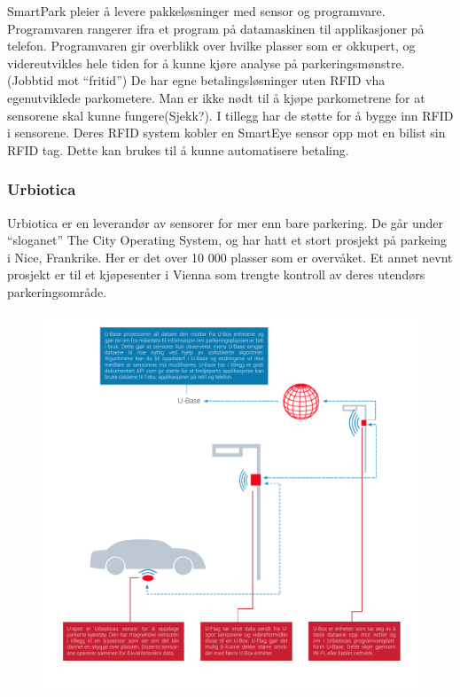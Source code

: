 \documentclass[a4paper, norsk, 12pt]{article}
\theoremstyle{remark}
\begin{document}
SmartPark pleier å levere pakkeløsninger med sensor og programvare. Programvaren rangerer ifra et program på datamaskinen til applikasjoner på telefon. Programvaren gir overblikk over hvilke plasser som er okkupert, og videreutvikles hele tiden for å kunne kjøre analyse på parkeringsmønstre. (Jobbtid mot “fritid”)
De har egne betalingsløsninger uten RFID vha egenutviklede parkometere. Man er ikke nødt til å kjøpe parkometrene for at sensorene skal kunne fungere(Sjekk?). I tillegg har de støtte for å bygge inn RFID i sensorene. Deres RFID system kobler en SmartEye sensor opp mot en bilist sin RFID tag. Dette kan brukes til å kunne automatisere betaling. 





\subsubsection{Urbiotica}
\label{ssub:urbiotica}
Urbiotica er en leverandør av sensorer for mer enn bare parkering. De går under “sloganet” The City Operating System, og har hatt et stort prosjekt på parkeing i Nice, Frankrike. Her er det over 10 000 plasser som er overvåket. Et annet nevnt prosjekt er til et kjøpesenter i Vienna som trengte kontroll av deres utendørs parkeringsområde. 

\begin{figure}[H]
\centering
\centerline{\includegraphics[scale=1.0, clip=true, trim=1cm 1.0cm 0.5cm 0.5cm]{grafikk/urbiotica.pdf}}
\end{figure}
\end{document}
